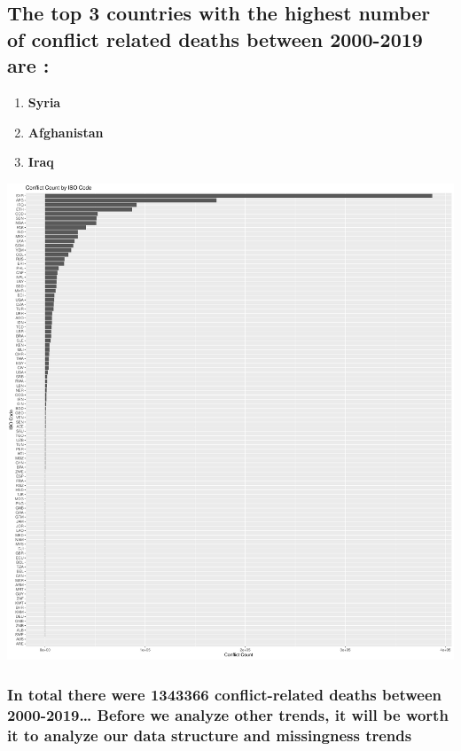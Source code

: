 \documentclass[
  letterpaper,
  DIV=11,
  numbers=noendperiod]{scrartcl}
\begin{document}
\subsection{The top 3 countries with the highest number of conflict
related deaths between 2000-2019 are
:}\label{the-top-3-countries-with-the-highest-number-of-conflict-related-deaths-between-2000-2019-are}

\begin{enumerate}
\def\labelenumi{\arabic{enumi}.}
\item
  \textbf{Syria}
\item
  \textbf{Afghanistan}
\item
  \textbf{Iraq}
\end{enumerate}

\includegraphics{MortalityDescriptives_files/figure-pdf/unnamed-chunk-5-1.pdf}

\subsubsection{In total there were 1343366 conflict-related deaths
between 2000-2019\ldots{} Before we analyze other trends, it will be
worth it to analyze our data structure and missingness
trends}\label{in-total-there-were-1343366-conflict-related-deaths-between-2000-2019-before-we-analyze-other-trends-it-will-be-worth-it-to-analyze-our-data-structure-and-missingness-trends}
\end{document}
